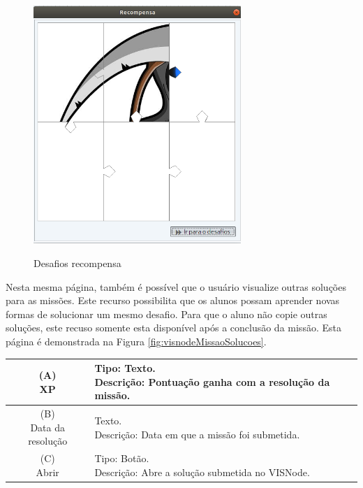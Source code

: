 \documentclass[
	12pt,				%
	oneside,			%
	a4paper,			%
	english,			%
	french,				%
	spanish,			%
	brazil,				%
	]{abntex2}
\begin{document}
\begin{figure}[H]
\centering
\caption{Desafios recompensa}
\includegraphics[width=0.7\textwidth]{imagens/visnode_desafios_recompensa.png}
\sourceAuthor
\label{fig:visnodeDesafiosRecompensa}
\end{figure}


Nesta mesma página, também é possível que o usuário visualize outras soluções para as missões. Este recurso possibilita que os alunos possam aprender novas formas de solucionar um mesmo desafio. Para que o aluno não copie outras soluções, este recuso somente esta disponível após a conclusão da missão. Esta página é demonstrada na Figura \ref{fig:visnodeMissaoSolucoes}. 

\begin{table}[H]
\centering
{} \label{tab:listagemMissoesSolucoes}
\renewcommand{\arraystretch}{1.8}
\setlength{\tabcolsep}{10pt}
\begin{tabular}{|c|l|}
  \hline
  \makecell{(A) \\ XP} 
  &
  \makecell[l]{Tipo: Texto.\\ Descrição: Pontuação ganha com a resolução da missão.} \\
  \hline
  \makecell{(B) \\ Data da resolução} 
  &
  \makecell[l]{Texto.\\ Descrição: Data em que a missão foi submetida.} \\
  \hline
  \makecell{(C) \\ Abrir} 
  &
  \makecell[l]{Tipo: Botão.\\ Descrição: Abre a solução submetida no VISNode.} \\
  \hline  
\end{tabular}
\centering
\sourceAuthor
\end{table}
\end{document}
